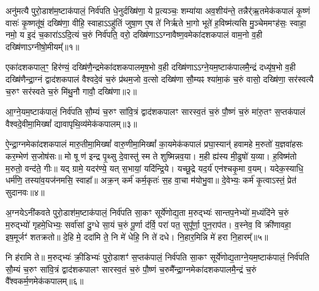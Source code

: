 \setcounter{anuvakam}{0}
अनु॑मत्यै पुरो॒डाश॑म॒ष्टाक॑पालं॒ निर्व॑पति धे॒नुर्दख्षि॑णा॒ ये प्र॒त्यञ्चः॒ शम्या॑या अव॒शीय॑न्ते॒ तन्नैर्॑ऋ॒तमेक॑कपालं कृ॒ष्णं वासः॑ कृ॒ष्णतू॑षं॒ दख्षि॑णा॒ वीहि॒ स्वाहा\-ऽ\-ऽहु॑तिं जुषा॒ण ए॒ष ते॑ निर्\mbox{}ऋते भा॒गो भूते॑ ह॒विष्म॑त्यसि मु॒ञ्चेममꣳह॑सः॒ स्वाहा॒ नमो॒ य इ॒दं च॒कारा॑\-ऽ\-ऽदि॒त्यं च॒रुं निर्व॑पति॒ वरो॒ दख्षि॑णा\-ऽ\-ऽग्नावैष्ण॒वमेका॑दशकपालं वाम॒नो व॒ही दख्षि॑णा\-ऽग्नीषो॒मीयम्᳚॥१॥

एका॑दशकपाल॒ꣳ॒ हिर॑ण्यं॒ दख्षि॑णै॒न्द्रमेका॑दशकपालमृष॒भो व॒ही दख्षि॑णा\-ऽ\-ऽग्ने॒यम॒ष्टाक॑पालमै॒न्द्रं दध्यृ॑ष॒भो व॒ही दख्षि॑णैन्द्रा॒ग्नं द्वाद॑शकपालं वैश्वदे॒वं च॒रुं प्र॑थम॒जो व॒त्सो दख्षि॑णा सौ॒म्यꣴ श्या॑मा॒कं च॒रुं वासो॒ दख्षि॑णा॒ सर॑स्वत्यै च॒रुꣳ सर॑स्वते च॒रुं मि॑थु॒नौ गावौ॒ दख्षि॑णा॥२॥

{\anuvakamend[{अ॒ग्नी॒षो॒मीयं॒ चतु॑स्त्रिꣳशच्च॥१॥}]}

आ॒ग्ने॒यम॒ष्टाक॑पालं॒ निर्व॑पति सौ॒म्यं च॒रुꣳ सा॑वि॒त्रं द्वाद॑शकपालꣳ सारस्व॒तं च॒रुं पौ॒ष्णं च॒रुं मा॑रु॒तꣳ स॒प्तक॑पालं वैश्वदे॒वीमा॒मिख्षां᳚ द्यावापृथि॒व्य॑मेक॑कपालम्॥३॥

{\anuvakamend[{आ॒ग्ने॒यम॒ष्टाद॑श॥२॥}]}

ऐ॒न्द्रा॒ग्नमेका॑दशकपालं मारु॒तीमा॒मिख्षां᳚ वारु॒णीमा॒मिख्षां᳚ का॒यमेक॑कपालं प्रघा॒स्यान्॑ हवामहे म॒रुतो॑ य॒ज्ञवा॑हसः कर॒म्भेण॑ स॒जोष॑सः॥ मो षू ण॑ इन्द्र पृ॒थ्सु दे॒वास्तु॑ स्म ते शुष्मिन्नव॒या। म॒ही ह्य॑स्य मी॒ढुषो॑ य॒व्या। ह॒विष्म॑तो म॒रुतो॒ वन्द॑ते॒ गीः॥ यद् ग्रामे॒ यदर॑ण्ये॒ यत् स॒भायां॒ यदि॑न्द्रि॒ये। यच्छू॒द्रे यद॒र्य॑ एन॑श्चकृ॒मा व॒यम्। यदेक॒स्याधि॒ धर्म॑णि॒ तस्या॑व॒यज॑नमसि॒ स्वाहा᳚॥ अक्र॒न् कर्म॑ कर्म॒कृतः॑ स॒ह वा॒चा म॑योभु॒वा॥ दे॒वेभ्यः॒ कर्म॑ कृ॒त्वा\-ऽस्तं॒ प्रेत॑ सुदानवः॥४॥

{\anuvakamend[{व॒यं यद् विꣳ॑श॒तिश्च॑॥३॥}]}

अ॒ग्नये\-ऽनी॑कवते पुरो॒डाश॑म॒ष्टाक॑पालं॒ निर्व॑पति सा॒कꣳ सूर्ये॑णोद्य॒ता म॒रुद्भ्यः॑ सान्तप॒नेभ्यो॑ म॒ध्यंदि॑ने च॒रुं म॒रुद्भ्यो॑ गृहमे॒धिभ्यः॒ सर्वा॑सां दु॒ग्धे सा॒यं च॒रुं पू॒र्णा द॑र्वि॒ परा॑ पत॒ सुपू᳚र्णा॒ पुन॒राप॑त। व॒स्नेव॒ वि क्री॑णावहा॒ इष॒मूर्जꣳ॑ शतक्रतो॥ दे॒हि मे॒ ददा॑मि ते॒ नि मे॑ धेहि॒ नि ते॑ दधे। नि॒हार॒मिन्नि मे॑ हरा नि॒हारम्᳚॥५॥

नि ह॑रामि ते॥ म॒रुद्भ्यः॑ क्री॒डिभ्यः॑ पुरो॒डाशꣳ॑ स॒प्तक॑पालं॒ निर्व॑पति सा॒कꣳ सूर्ये॑णोद्य॒ताग्ने॒यम॒ष्टाक॑पालं॒ निर्व॑पति सौ॒म्यं च॒रुꣳ सा॑वि॒त्रं द्वाद॑शकपालꣳ सारस्व॒तं च॒रुं पौ॒ष्णं च॒रुमै᳚न्द्रा॒ग्नमेका॑दशकपालमै॒न्द्रं च॒रुं वै᳚श्वकर्म॒णमेक॑कपालम्॥६॥

